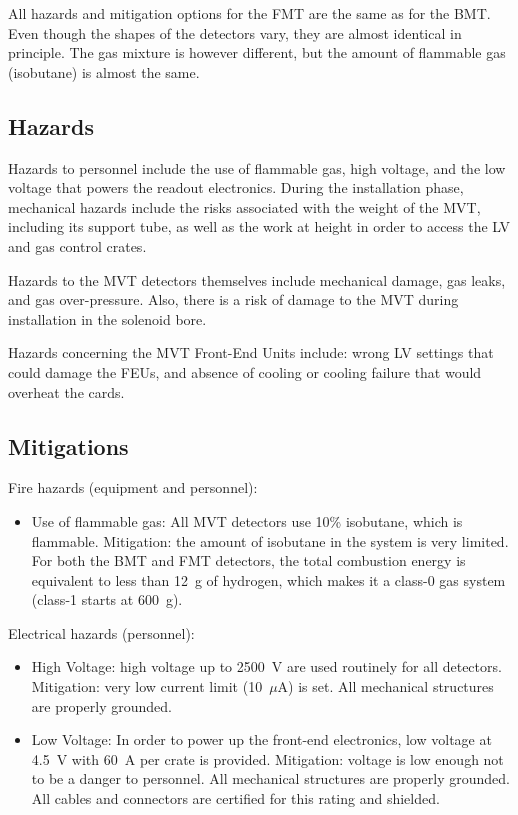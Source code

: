 All hazards and mitigation options for the FMT are the same as for the BMT. Even though the 
shapes of the detectors vary, they are almost identical in principle. The gas mixture is 
however different, but the amount of flammable gas (isobutane) is almost the same.

\subsection{Hazards} 

Hazards to personnel include the use of flammable gas, high voltage, and the low voltage that 
powers the readout electronics. During the installation phase, mechanical hazards include the 
risks associated with the weight of the MVT, including its support tube, as well as the work at 
height in order to access the LV and gas control crates.

Hazards to the MVT detectors themselves include mechanical damage, gas leaks, and gas 
over-pressure. Also, there is a risk of damage to the MVT during installation in the solenoid 
bore.

Hazards concerning the MVT Front-End Units include: wrong LV settings that could damage the FEUs, 
and absence of cooling or cooling failure that would overheat the cards.

\subsection{Mitigations}

Fire hazards (equipment and personnel):
\begin{itemize}
\item Use of flammable gas: All MVT detectors use 10\% isobutane, which is flammable. Mitigation: 
the amount of isobutane in the system is very limited. For both the BMT and FMT detectors, the 
total combustion energy is equivalent to less than 12~g of hydrogen, which makes it a class-0 
gas system (class-1 starts at 600~g).
\end{itemize}

Electrical hazards (personnel):
\begin{itemize}
\item High Voltage: high voltage up to 2500~V are used routinely for all detectors. Mitigation: 
very low current limit (10~$\mu$A) is set. All mechanical structures are properly grounded.
\item Low Voltage: In order to power up the front-end electronics, low voltage at 4.5~V 
with 60~A per crate is provided. Mitigation: voltage is low enough not to be a danger to personnel. All 
mechanical structures are properly grounded. All cables and connectors are certified for this 
rating and shielded.
\end{itemize}

